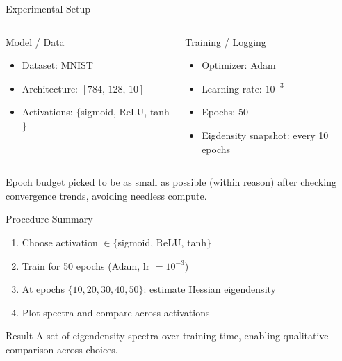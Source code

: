 \documentclass[11pt]{beamer}
\begin{document}
\begin{frame}{Experimental Setup}
    \begin{columns}[T,onlytextwidth]
      \begin{block}{Model / Data}
      \begin{itemize}
        \item Dataset: MNIST
        \item Architecture: \([784,\,128,\,10]\)
        \item Activations: \(\{\)sigmoid, ReLU, tanh\(\}\)
      \end{itemize}
      \end{block}
    
      \begin{block}{Training / Logging}
      \begin{itemize}
        \item Optimizer: Adam
        \item Learning rate: \(10^{-3}\)
        \item Epochs: 50
        \item Eigdensity snapshot: every 10 epochs
      \end{itemize}
      \end{block}
    \end{columns}
    
    \vspace{0.4em}
    \footnotesize
    Epoch budget picked to be as small as possible (within reason) after checking convergence trends, avoiding needless compute.
\end{frame}


\begin{frame}{Procedure Summary}
    \begin{enumerate}
      \item Choose activation \(\in\{\)sigmoid, ReLU, tanh\(\}\)
      \item Train for 50 epochs (Adam, lr \(=10^{-3}\))
      \item At epochs \(\{10,20,30,40,50\}\): estimate Hessian eigendensity
      \item Plot spectra and compare across activations
    \end{enumerate}
    
    \vspace{0.5em}
    \begin{block}{Result}
    A set of eigendensity spectra over training time, enabling qualitative comparison across choices.
    \end{block}
\end{frame}
\end{document}
